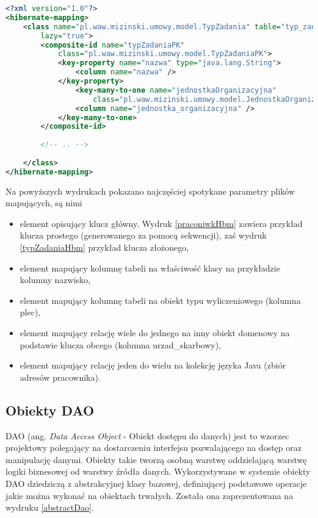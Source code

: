 \begin{lstlisting}[language=XML,style=outcode,showstringspaces=false,caption=Przykład pliku mapującego Hibernate wykorzystującego klucz złożony,label={typZadaniaHbm}]
<?xml version="1.0"?>
<hibernate-mapping>
	<class name="pl.waw.mizinski.umowy.model.TypZadania" table="typ_zadania"
		lazy="true">
		<composite-id name="typZadaniaPK" 
			class="pl.waw.mizinski.umowy.model.TypZadaniaPK">
			<key-property name="nazwa" type="java.lang.String">
				<column name="nazwa" />
			</key-property>
				<key-many-to-one name="jednostkaOrganizacyjna" 
					class="pl.waw.mizinski.umowy.model.JednostkaOrganizacyjna">
				<column name="jednostka_organizacyjna" />
			</key-many-to-one>
		</composite-id>
		
		<!-- .. -->
	
	</class>
</hibernate-mapping>
\end{lstlisting}

Na powyższych wydrukach pokazano najczęściej spotykane parametry plików mapujących, są nimi
\begin{itemize}
	\item element opisujący klucz główny. Wydruk \ref{praconiwkHbm} zawiera przykład klucza prostego (generowanego za pomocą sekwencji), zaś wydruk \ref{typZadaniaHbm} przykład klucza złożonego,
	\item element mapujący kolumnę tabeli na właściwość klasy na przykładzie kolumny nazwisko,
	\item element mapujący kolumnę tabeli na obiekt typu wyliczeniowego (kolumna plec),
	\item element mapujący relację wiele do jednego na inny obiekt domenowy na podstawie klucza obcego (kolumna urzad\_skarbowy),
	\item element mapujący relację jeden do wielu na kolekcję języka Java (zbiór adresów pracownika).
\end{itemize}


\subsection[Obiekty DAO][Obiekty DAO]{Obiekty DAO}
DAO (ang. \textit{Data Access Object} - Obiekt dostępu do danych) jest to wzorzec projektowy polegający na dostarczeniu interfejsu pozwalającego na dostęp oraz manipulację danymi. Obiekty takie tworzą osobną warstwę oddzielającą warstwę logiki biznesowej od warstwy źródła danych. Wykorzystywane w systemie obiekty DAO dziedziczą z abstrakcyjnej klasy bazowej, definiującej podstawowe operacje jakie można wykonać na obiektach trwałych. Została ona zaprezentowana na wydruku \ref{abstractDao}.

